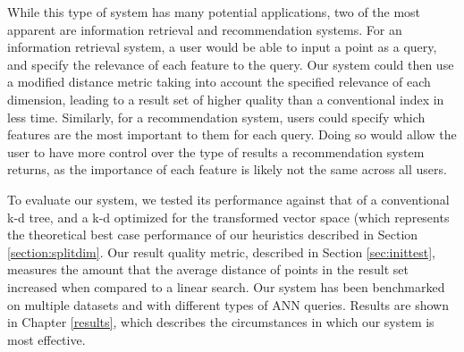 While this type of system has many potential applications, two of the most apparent are   information retrieval and recommendation systems.  For an information retrieval system, a user would be able to input a point as a query, and specify the relevance of each feature to the query.  Our system could then use a modified distance metric taking into account the specified relevance of each dimension, leading to a result set of higher quality than a conventional index in less time.  Similarly, for a recommendation system, users could specify which features are the most important to them for each query.  Doing so would allow the user to have more control over the type of results a recommendation system returns, as the importance of each feature is likely not the same across all users.

To evaluate our system, we tested its performance against that of a conventional \mbox{k-d} tree, and a k-d optimized for the transformed vector space (which represents the theoretical best case performance of our heuristics described in Section \ref{section:splitdim}.  Our result quality metric, described in Section \ref{sec:inittest}, measures the amount that the average distance of points in the result set increased when compared to a linear search.  Our system has been benchmarked on multiple datasets and with different types of ANN queries.  Results are shown in Chapter \ref{results}, which describes the circumstances in which our system is most effective.